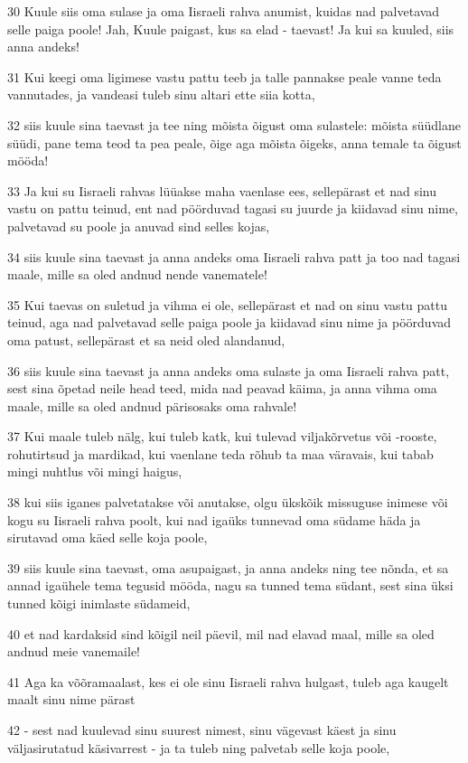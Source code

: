 \par 30 Kuule siis oma sulase ja oma Iisraeli rahva anumist, kuidas nad palvetavad selle paiga poole! Jah, Kuule paigast, kus sa elad - taevast! Ja kui sa kuuled, siis anna andeks!
\par 31 Kui keegi oma ligimese vastu pattu teeb ja talle pannakse peale vanne teda vannutades, ja vandeasi tuleb sinu altari ette siia kotta,
\par 32 siis kuule sina taevast ja tee ning mõista õigust oma sulastele: mõista süüdlane süüdi, pane tema teod ta pea peale, õige aga mõista õigeks, anna temale ta õigust mööda!
\par 33 Ja kui su Iisraeli rahvas lüüakse maha vaenlase ees, sellepärast et nad sinu vastu on pattu teinud, ent nad pöörduvad tagasi su juurde ja kiidavad sinu nime, palvetavad su poole ja anuvad sind selles kojas,
\par 34 siis kuule sina taevast ja anna andeks oma Iisraeli rahva patt ja too nad tagasi maale, mille sa oled andnud nende vanematele!
\par 35 Kui taevas on suletud ja vihma ei ole, sellepärast et nad on sinu vastu pattu teinud, aga nad palvetavad selle paiga poole ja kiidavad sinu nime ja pöörduvad oma patust, sellepärast et sa neid oled alandanud,
\par 36 siis kuule sina taevast ja anna andeks oma sulaste ja oma Iisraeli rahva patt, sest sina õpetad neile head teed, mida nad peavad käima, ja anna vihma oma maale, mille sa oled andnud pärisosaks oma rahvale!
\par 37 Kui maale tuleb nälg, kui tuleb katk, kui tulevad viljakõrvetus või -rooste, rohutirtsud ja mardikad, kui vaenlane teda rõhub ta maa väravais, kui tabab mingi nuhtlus või mingi haigus,
\par 38 kui siis iganes palvetatakse või anutakse, olgu ükskõik missuguse inimese või kogu su Iisraeli rahva poolt, kui nad igaüks tunnevad oma südame häda ja sirutavad oma käed selle koja poole,
\par 39 siis kuule sina taevast, oma asupaigast, ja anna andeks ning tee nõnda, et sa annad igaühele tema tegusid mööda, nagu sa tunned tema südant, sest sina üksi tunned kõigi inimlaste südameid,
\par 40 et nad kardaksid sind kõigil neil päevil, mil nad elavad maal, mille sa oled andnud meie vanemaile!
\par 41 Aga ka võõramaalast, kes ei ole sinu Iisraeli rahva hulgast, tuleb aga kaugelt maalt sinu nime pärast
\par 42 - sest nad kuulevad sinu suurest nimest, sinu vägevast käest ja sinu väljasirutatud käsivarrest - ja ta tuleb ning palvetab selle koja poole,
